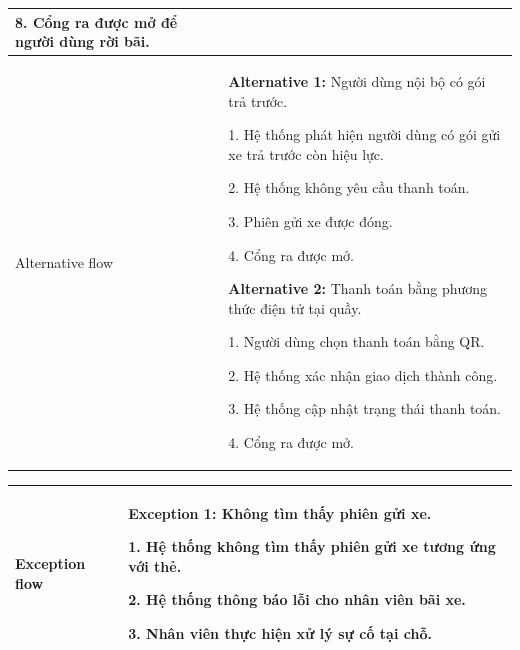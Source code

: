 \begin{center}
\begin{tabular}{|m{2.5cm}|m{13cm}|}
        8. Cổng ra được mở để người dùng rời bãi.\\
    \hline
        Alternative flow & 
       \textbf{Alternative 1:} Người dùng nội bộ có gói trả trước.

        1. Hệ thống phát hiện người dùng có gói gửi xe trả trước còn hiệu lực.

        2. Hệ thống không yêu cầu thanh toán.

        3. Phiên gửi xe được đóng.

        4. Cổng ra được mở.

         \textbf{Alternative 2:} Thanh toán bằng phương thức điện tử tại quầy.

        1. Người dùng chọn thanh toán bằng QR.

        2. Hệ thống xác nhận giao dịch thành công.

        3. Hệ thống cập nhật trạng thái thanh toán.

        4. Cổng ra được mở. 
        \\ 
    \hline
    \end{tabular}
\end{center}
\begin{center}
    \begin{tabular}{|m{2.5cm}|m{13cm}|}
    \hline
        Exception flow & 
        \textbf{Exception 1:} Không tìm thấy phiên gửi xe.

        1. Hệ thống không tìm thấy phiên gửi xe tương ứng với thẻ.

        2. Hệ thống thông báo lỗi cho nhân viên bãi xe.

        3. Nhân viên thực hiện xử lý sự cố tại chỗ.
    
        \\
    \hline
    \end{tabular}
\end{center}